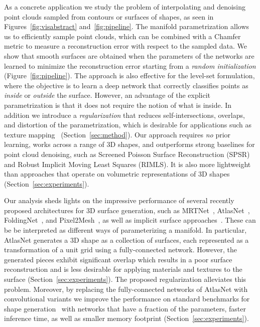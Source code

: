 As a concrete application we study the problem of 
interpolating and denoising point clouds sampled from contours or surfaces of
shapes, as seen in Figures~\ref{fig:visabstract} and~\ref{fig:pipeline}.
The manifold parametrization allows us to efficiently sample point
clouds, which can be combined with a Chamfer metric to measure a
reconstruction error with respect to the sampled data. 
We show that smooth surfaces are obtained when the parameters of the networks are learned to minimize the reconstruction error starting from a \emph{random initialization} (Figure~\ref{fig:pipeline}).
The approach is also effective for the level-set formulation, where the objective is to learn a deep network that correctly classifies points as \emph{inside} or \emph{outside} the surface.
However, an advantage of the explicit parametrization is that it does
not require the notion of what is inside.
In addition we introduce a \emph{regularization} that reduces self-intersections, overlaps, and distortion of the parametrization, which is desirable for applications such as texture mapping ~(Section~\ref{sec:method}).
Our approach requires \emph{no} prior learning, works across a range of 3D
shapes, and outperforms strong baselines for point cloud denoising, 
such as Screened Poisson Surface Reconstruction (SPSR) and Robust Implicit Moving Least Squares (RIMLS).
It is also more lightweight than approaches that
operate on volumetric representations of 3D shapes (Section~\ref{sec:experiments}).

Our analysis sheds lights on the impressive performance of several
recently proposed architectures for 3D surface generation, such as
MRTNet~\cite{mrt18}, AtlasNet~\cite{atlasnet}, FoldingNet~\cite{yang2018foldingnet}, and Pixel2Mesh~\cite{pixel2mesh}, as well as implicit surface approaches~\cite{chen2019learning,mescheder2019occupancy,genova2019learning,park2019deepsdf}.
These can be be interpreted
as different ways of parameterizing a manifold.
In particular, AtlasNet generates a 3D shape as a collection of surfaces, each represented as a
transformation of a unit grid using a fully-connected network.
However, the generated pieces exhibit significant overlap which
results in a poor surface reconstruction and is less desirable for
applying materials and textures to the surface (Section~\ref{sec:experiments}).
The proposed regularization alleviates this problem. 
Moreover, by replacing the fully-connected networks of AtlasNet with
convolutional variants we improve the performance on standard
benchmarks for shape generation~\cite{choy20163d} with networks that have a
fraction of the parameters, faster inference time, as well
as smaller memory footprint (Section~\ref{sec:experiments}).

